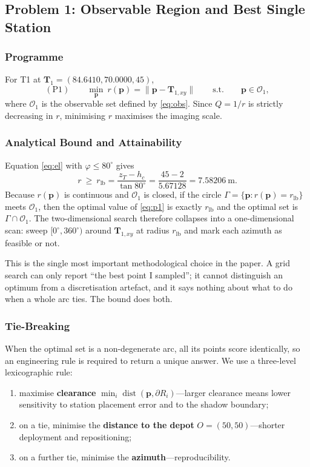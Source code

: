 \documentclass[12pt]{article}
\begin{document}
\subsection{Problem 1: Observable Region and Best Single Station}

\subsubsection{Programme}

For T1 at $\bm T_1=(84.6410,70.0000,45)$,
\begin{equation}
\label{eq:p1}
(\mathrm{P1})\qquad
\min_{\bm p}\ r(\bm p)=\|\bm p-\bm T_{1,xy}\|
\qquad\text{s.t.}\qquad \bm p\in\mathcal O_1 ,
\end{equation}
where $\mathcal O_1$ is the observable set defined by \eqref{eq:obs}. Since $Q=1/r$ is strictly decreasing in $r$, minimising $r$ maximises the imaging scale.

\subsubsection{Analytical Bound and Attainability}

Equation \eqref{eq:el} with $\varphi\le80^\circ$ gives
\begin{equation}
\label{eq:rlb}
r\ \ge\ r_{\mathrm{lb}}=\frac{z_T-h_c}{\tan80^\circ}=\frac{45-2}{5.67128}=7.58206\ \mathrm{m}.
\end{equation}
Because $r(\bm p)$ is continuous and $\mathcal O_1$ is closed, if the circle $\Gamma=\{\bm p: r(\bm p)=r_{\mathrm{lb}}\}$ meets $\mathcal O_1$, then the optimal value of \eqref{eq:p1} is exactly $r_{\mathrm{lb}}$ and the optimal set is $\Gamma\cap\mathcal O_1$. The two-dimensional search therefore collapses into a one-dimensional scan: sweep $[0^\circ,360^\circ)$ around $\bm T_{1,xy}$ at radius $r_{\mathrm{lb}}$ and mark each azimuth as feasible or not.

This is the single most important methodological choice in the paper. A grid search can only report ``the best point I sampled''; it cannot distinguish an optimum from a discretisation artefact, and it says nothing about what to do when a whole arc ties. The bound does both.

\subsubsection{Tie-Breaking}

When the optimal set is a non-degenerate arc, all its points score identically, so an engineering rule is required to return a unique answer. We use a three-level lexicographic rule:
\begin{enumerate}[leftmargin=2em]
  \item maximise \textbf{clearance} $\min_i\operatorname{dist}(\bm p,\partial R_i)$---larger clearance means lower sensitivity to station placement error and to the shadow boundary;
  \item on a tie, minimise the \textbf{distance to the depot} $O=(50,50)$---shorter deployment and repositioning;
  \item on a further tie, minimise the \textbf{azimuth}---reproducibility.
\end{enumerate}
\end{document}
